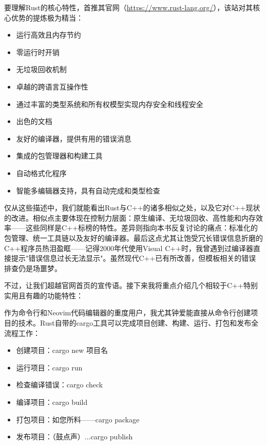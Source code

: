 
要理解Rust的核心特性，首推其官网（\url{https://www.rust-lang.org/}），该站对其核心优势的提炼极为精当：

\begin{itemize}
\item 
运行高效且内存节约

\item 
零运行时开销

\item 
无垃圾回收机制

\item 
卓越的跨语言互操作性

\item 
通过丰富的类型系统和所有权模型实现内存安全和线程安全

\item 
出色的文档

\item 
友好的编译器，提供有用的错误消息

\item 
集成的包管理器和构建工具

\item 
自动格式化程序

\item 
智能多编辑器支持，具有自动完成和类型检查
\end{itemize}

仅从这些描述中，我们就能看出Rust与C++的诸多相似之处，以及它对C++现状的改进。相似点主要体现在控制力层面：原生编译、无垃圾回收、高性能和内存效率——这些同样是C++标榜的特性。差异则指向本书反复讨论的痛点：标准化的包管理、统一工具链以及友好的编译器。最后这点尤其让饱受冗长错误信息折磨的C++程序员热泪盈眶——记得2000年代使用Visual C++时，我曾遇到过编译器直接提示"错误信息过长无法显示"。虽然现代C++已有所改善，但模板相关的错误排查仍是场噩梦。

不过，让我们超越官网首页的宣传语。接下来我将重点介绍几个相较于C++特别实用且有趣的功能特性：


作为命令行和Neovim代码编辑器的重度用户，我尤其钟爱能直接从命令行创建项目的技术。Rust自带的cargo工具可以完成项目创建、构建、运行、打包和发布全流程工作：

\begin{itemize}
\item 
创建项目：cargo new 项目名

\item 
运行项目：cargo run

\item 
检查编译错误：cargo check

\item 
编译项目：cargo build

\item 
打包项目：如您所料——cargo package

\item 
发布项目：（鼓点声）...cargo publish
\end{itemize}

